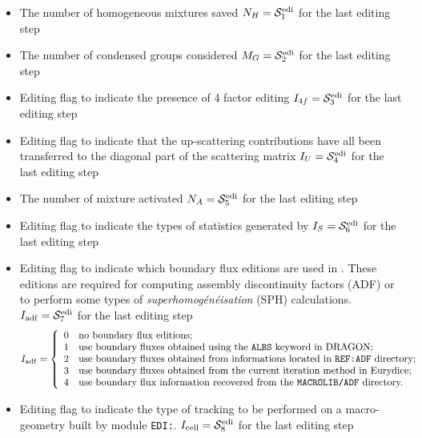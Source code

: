 \begin{itemize}
\item The number of homogeneous mixtures saved $N_{H}=\mathcal{S}^{\rm edi}_{1}$ for the last editing step
\item The number of condensed groups considered $M_{G}=\mathcal{S}^{\rm edi}_{2}$  for the last editing step
\item Editing flag to indicate the presence of 4 factor editing $I_{4f}=\mathcal{S}^{\rm edi}_{3}$ for
the last editing step
\item Editing flag to indicate that the up-scattering contributions have all been transferred to
      the diagonal part of the scattering matrix $I_{U}=\mathcal{S}^{\rm edi}_{4}$ for the last editing step
\item The number of mixture activated $N_{A}=\mathcal{S}^{\rm edi}_{5}$ for the last editing step 
\item Editing flag to indicate the types of statistics generated by 
      $I_{S}=\mathcal{S}^{\rm edi}_{6}$ for the last editing step
\item Editing flag to indicate which boundary flux editions are used in . These editions are required for computing
assembly discontinuity factors (ADF) or to perform some types of {\sl superhomog\'en\'eisation} (SPH) calculations.
      $I_{\rm adf}=\mathcal{S}^{\rm edi}_{7}$ for the last editing step
\begin{displaymath}
I_{\rm adf} = \left\{
\begin{array}{ll}
0 & \textrm{no boundary flux editions;} \\
1 & \textrm{use boundary fluxes obtained using the \moc{ALBS} keyword in DRAGON;} \\
2 & \textrm{use boundary fluxes obtained from informations located in {\tt REF:ADF} directory;} \\
3 & \textrm{use boundary fluxes obtained from the current iteration method in Eurydice;} \\
4 & \textrm{use boundary flux information recovered from the {\tt MACROLIB/ADF} directory.} \\
\end{array} \right.
\end{displaymath}
\item Editing flag to indicate the type of tracking to be performed on a macro-geometry built by module {\tt EDI:}.
      $I_{\rm cell}=\mathcal{S}^{\rm edi}_{8}$ for the last editing step
\begin{displaymath}

\end{displaymath}
\end{itemize}

